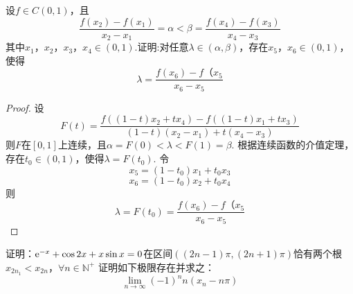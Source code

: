 \begin{proposition}

    设$f \in C(0,1)$，且
    $$\dfrac{f(x_2) - f(x_1)}{x_2 - x_1} = \alpha < \beta = \dfrac{f(x_4)- f(x_3)}{x_4 - x_3}$$    
    其中$x_1$，$x_2$，$x_3$，$x_4 \in (0,1)$.证明:对任意$\lambda \in (\alpha, \beta)$，存在$x_5$，$x_6 \in (0,1)$，使得
    $$\lambda = \dfrac{f(x_6) - f（x_5}{x_6 - x_5}$$

\end{proposition}

\begin{proof}

    设
    $$F(t) = \dfrac{f((1 - t)x_2 + tx_4) - f((1 - t)x_1 + tx_3)}{(1 - t)(x_2 - x_1) + t(x_4 - x_3)}$$
    则$F$在$[0,1]$上连续，且$\alpha = F(0) < \lambda < F(1) = \beta$. 根据连续函数的介值定理，存在$t_0 \in (0,1)$，使得$\lambda = F(t_0)$. 令
    $$x_5 = (1 - t_0)x_1 + t_0 x_3$$
    $$x_6 = (1 - t_0)x_2 + t_0 x_4$$
    则
    $$\lambda = F(t_0) = \dfrac{f(x_6) - f（x_5}{x_6 - x_5}$$

\end{proof}

\begin{proposition}

    证明：$\mathrm{e}^{-x} + \cos{2x} + x\sin{x} = 0$在区间$((2n -1)\pi, (2n + 1)\pi)$恰有两个根$x_{2n _1} < x_{2n}$，$\forall n \in \mathbb{N}^{+}$
    证明如下极限存在并求之：
    $$\lim\limits_{n \to \infty}{(-1)^n n(x_n - n\pi)}$$
    
\end{proposition}

